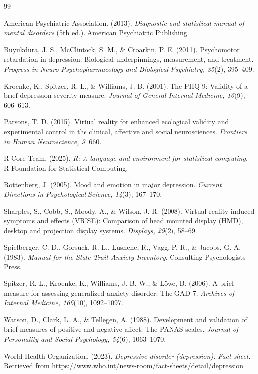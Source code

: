 \documentclass[12pt]{article}
\begin{document}
\begin{thebibliography}{99}

American Psychiatric Association. (2013). \emph{Diagnostic and statistical manual of mental disorders} (5th ed.). American Psychiatric Publishing.

Buyukdura, J. S., McClintock, S. M., \& Croarkin, P. E. (2011). Psychomotor retardation in depression: Biological underpinnings, measurement, and treatment. \emph{Progress in Neuro-Psychopharmacology and Biological Psychiatry, 35}(2), 395--409.

Kroenke, K., Spitzer, R. L., \& Williams, J. B. (2001). The PHQ-9: Validity of a brief depression severity measure. \emph{Journal of General Internal Medicine, 16}(9), 606--613.

Parsons, T. D. (2015). Virtual reality for enhanced ecological validity and experimental control in the clinical, affective and social neurosciences. \emph{Frontiers in Human Neuroscience, 9}, 660.

R Core Team. (2025). \emph{R: A language and environment for statistical computing}. R Foundation for Statistical Computing.

Rottenberg, J. (2005). Mood and emotion in major depression. \emph{Current Directions in Psychological Science, 14}(3), 167--170.

Sharples, S., Cobb, S., Moody, A., \& Wilson, J. R. (2008). Virtual reality induced symptoms and effects (VRISE): Comparison of head mounted display (HMD), desktop and projection display systems. \emph{Displays, 29}(2), 58--69.

Spielberger, C. D., Gorsuch, R. L., Lushene, R., Vagg, P. R., \& Jacobs, G. A. (1983). \emph{Manual for the State-Trait Anxiety Inventory}. Consulting Psychologists Press.

Spitzer, R. L., Kroenke, K., Williams, J. B. W., \& L\"{o}we, B. (2006). A brief measure for assessing generalized anxiety disorder: The GAD-7. \emph{Archives of Internal Medicine, 166}(10), 1092--1097.

Watson, D., Clark, L. A., \& Tellegen, A. (1988). Development and validation of brief measures of positive and negative affect: The PANAS scales. \emph{Journal of Personality and Social Psychology, 54}(6), 1063--1070.

World Health Organization. (2023). \emph{Depressive disorder (depression): Fact sheet}. Retrieved from \url{https://www.who.int/news-room/fact-sheets/detail/depression}

\end{thebibliography}
\end{document}
